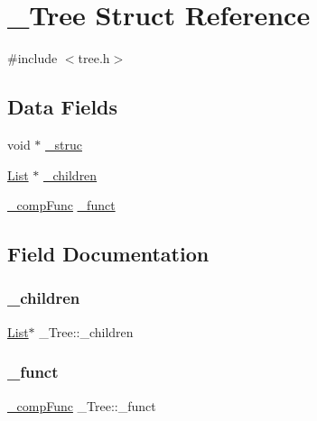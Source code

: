 \hypertarget{struct__Tree}{}\section{\+\_\+\+Tree Struct Reference}
\label{struct__Tree}


{\ttfamily \#include $<$tree.\+h$>$}

\subsection*{Data Fields}
\begin{DoxyCompactItemize}
\item 
void $\ast$ \mbox{\hyperlink{struct__Tree_a092eb0c0eeebcdfb1be9ef09aa2da570}{\+\_\+struc}}
\item 
\mbox{\hyperlink{structList}{List}} $\ast$ \mbox{\hyperlink{struct__Tree_a11aee979ce213bff45ff720ac1dbf85a}{\+\_\+children}}
\item 
\mbox{\hyperlink{list_8h_a635855f2315417070aa4dbae27b6e4a6}{\+\_\+comp\+Func}} \mbox{\hyperlink{struct__Tree_a436639ce6e12fed08dbc85cb6f9960ed}{\+\_\+funct}}
\end{DoxyCompactItemize}


\subsection{Field Documentation}
\mbox{\label{struct__Tree_a11aee979ce213bff45ff720ac1dbf85a}} 
\subsubsection{\texorpdfstring{\+\_\+children}{\_children}}
{\footnotesize\ttfamily \mbox{\hyperlink{structList}{List}}$\ast$ \+\_\+\+Tree\+::\+\_\+children}

\mbox{\label{struct__Tree_a436639ce6e12fed08dbc85cb6f9960ed}} 
\subsubsection{\texorpdfstring{\+\_\+funct}{\_funct}}
{\footnotesize\ttfamily \mbox{\hyperlink{list_8h_a635855f2315417070aa4dbae27b6e4a6}{\+\_\+comp\+Func}} \+\_\+\+Tree\+::\+\_\+funct}

